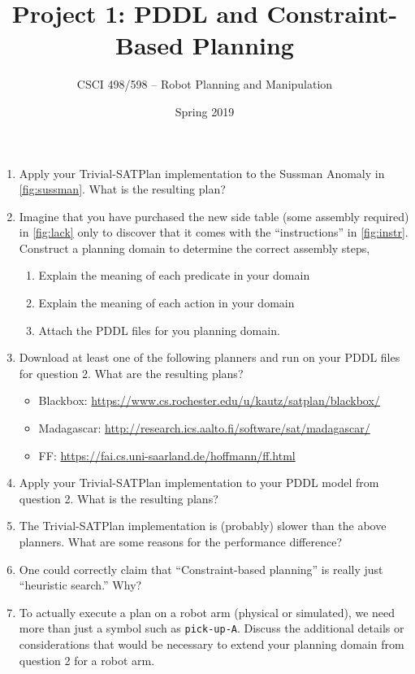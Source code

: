 \documentclass[12pt,letterpaper]{ntdhw}
\title{Project 1: PDDL and Constraint-Based Planning}
\author{CSCI 498/598 -- Robot Planning and Manipulation}
\date{Spring 2019}
\begin{document}
\pagestyle{fancyplain}

\maketitle
\thispagestyle{fancyplain}

\begin{enumerate}

  \item Apply your Trivial-SATPlan implementation to the Sussman
  Anomaly in \autoref{fig:sussman}.  What is the resulting plan?

  \item Imagine that you have purchased the new side table (some
  assembly required) in \autoref{fig:lack} only to discover that it
  comes with the ``instructions'' in \autoref{fig:instr}. Construct a
  planning domain to determine the correct assembly steps,
  \begin{enumerate}
    \item Explain the meaning of each predicate in your domain
    \item Explain the meaning of each action in your domain
    \item Attach the PDDL files for you planning domain.
  \end{enumerate}


  \item Download at least one of the following planners and run on
  your PDDL files for question 2.  What are the resulting plans?
  \begin{itemize}
    \item Blackbox:
    \url{https://www.cs.rochester.edu/u/kautz/satplan/blackbox/}
    \item Madagascar:
    \url{http://research.ics.aalto.fi/software/sat/madagascar/}
    \item FF:
    \url{https://fai.cs.uni-saarland.de/hoffmann/ff.html}
  \end{itemize}

  \item Apply your Trivial-SATPlan implementation to your PDDL model
  from question 2.  What is the resulting plans?

  \item The Trivial-SATPlan implementation is (probably) slower than
  the above planners.  What are some reasons for the performance
  difference?

  \item One could correctly claim that ``Constraint-based planning''
  is really just ``heuristic search.''  Why?

  \item To actually execute a plan on a robot arm (physical or
  simulated), we need more than just a symbol such as {\tt pick-up-A}.
  Discuss the additional details or considerations that would be
  necessary to extend your planning domain from question 2 for a robot
  arm.

\end{enumerate}
\end{document}
